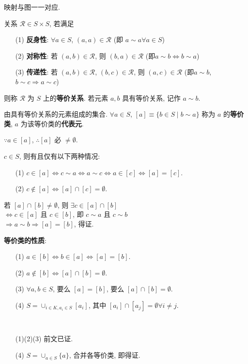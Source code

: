 \documentclass{note}
\begin{document}
映射与图一一对应.

\begin{df}[等价关系]
    关系 $\mathcal{R}\in S\times S$, 若满足
    \begin{itemize}
        \item[(1)] \textbf{反身性}: $\forall a\in S$, $(a,a)\in\mathcal{R}$ (即 $a\sim a\forall a\in S$)
        \item[(2)] \textbf{对称性}: 若 $(a,b)\in\mathcal{R}$, 则 $(b,a)\in\mathcal{R}$ (即$a\sim b\Longleftrightarrow b\sim a$)
        \item[(3)] \textbf{传递性}: 若 $(a,b)\in\mathcal{R}$, $(b,c)\in\mathcal{R}$, 则 $(a,c)\in\mathcal{R}$ (即$a\sim b$, $b\sim c\Longrightarrow a\sim c$)
    \end{itemize}
    则称 $\mathcal{R}$ 为 $S$ 上的\textbf{等价关系}. 若元素 $a,b$ 具有等价关系, 记作 $a\sim b$.
\end{df}

\begin{df}[等价类]
    由具有等价关系的元素组成的集合. $\forall a\in S$, $[a]\equiv\{b\in S\mid b\sim a\}$ 称为 $a$ 的\textbf{等价类}, $a$ 为该等价类的\textbf{代表元}.
\end{df}

$\because a\in[a]$, $\therefore[a]$ 必 $\neq\emptyset$.

$c\in S$, 则有且仅有以下两种情况:
\begin{itemize}
    \item[(1)] $c\in[a]\Longleftrightarrow c\sim a\Longleftrightarrow a\sim c\Longleftrightarrow a\in[c]\Longleftrightarrow[a]=[c]$.
    \item[(2)] $c\notin[a]\Longleftrightarrow[a]\cap[c]=\emptyset$.
\end{itemize}
\begin{pf}
    若 $[a]\cap[b]\neq\emptyset$, 则 $\exists c\in[a]\cap[b]$\\
    $\Longleftrightarrow c\in[a]$ 且 $c\in[b]$, 即 $c\sim a$ 且 $c\sim b$\\
    $\Longrightarrow a\sim b\Longrightarrow[a]=[b]$, 得证.
\end{pf}

\textbf{等价类的性质}:
\begin{itemize}
    \item[(1)] $a\in[b]\Longleftrightarrow b\in[a]\Longleftrightarrow[a]=[b]$.
    \item[(2)] $a\notin[b]\Longleftrightarrow[a]\cap[b]=\emptyset$.
    \item[(3)] $\forall a,b\in S$, 要么 $[a]=[b]$, 要么 $[a]\cap[b]=\emptyset$.
    \item[(4)] $S=\cup_{i\in K,a_i\in S}[a_i]$, 其中 $[a_i]\cap[a_j]=\emptyset\forall i\neq j$.
\end{itemize}
\begin{pf}~
    \begin{itemize}
        \item[(1)(2)(3)] 前文已证.
        \item[(4)] $S=\cup_{a\in S}\{a\}$, 合并各等价类, 即得证.
    \end{itemize}
\end{pf}
\end{document}
